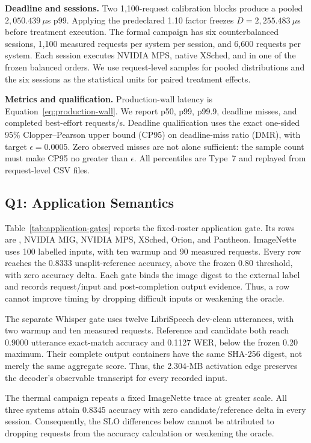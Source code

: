 \textbf{Deadline and sessions.}
Two 1,100-request calibration blocks produce a pooled
$2{,}050.439~\mu$s p99.  Applying the predeclared 1.10 factor freezes
$D=2{,}255.483~\mu$s before treatment execution.  The formal campaign has six
counterbalanced sessions, 1,100 measured requests per system per session, and
6,600 requests per system.  Each session executes NVIDIA MPS, native XSched,
and \sys in one of the frozen balanced orders.  We use request-level samples
for pooled distributions and the six sessions as the statistical units for
paired treatment effects.

\textbf{Metrics and qualification.}
Production-wall latency is Equation~\ref{eq:production-wall}.  We report p50,
p99, p99.9, deadline misses, and completed best-effort requests/s.  Deadline
qualification uses the exact one-sided 95\% Clopper--Pearson upper bound
(CP95) on deadline-miss ratio (DMR), with target $\epsilon=0.0005$.
Zero observed misses are not alone sufficient: the sample count must make
CP95 no greater than $\epsilon$.  All percentiles are Type~7 and replayed from
request-level CSV files.

\subsection{Q1: Application Semantics}

\PnineApplicationTable

Table~\ref{tab:application-gates} reports the fixed-roster application gate.
Its rows are \sys, NVIDIA MIG, NVIDIA MPS, XSched, Orion, and Pantheon.
ImageNette uses
100 labelled inputs, with ten warmup and 90 measured requests.  Every row
reaches the 0.8333 unsplit-reference accuracy, above the frozen 0.80 threshold,
with zero accuracy delta.  Each gate binds the image digest to the external
label and records request/input and post-completion output evidence.  Thus, a
row cannot improve timing by dropping difficult inputs or weakening the
oracle.

The separate \sys Whisper gate uses twelve LibriSpeech dev-clean utterances,
with two warmup and ten measured requests.  Reference and candidate both reach
0.9000 utterance exact-match accuracy and 0.1127 WER, below the frozen 0.20
maximum.  Their complete output containers have the same SHA-256 digest, not
merely the same aggregate score.  Thus, the 2.304-MB activation edge preserves
the decoder's observable transcript for every recorded input.

The thermal campaign repeats a fixed ImageNette trace at greater scale.  All
three systems attain 0.8345 accuracy with zero candidate/reference delta in
every session.  Consequently, the SLO differences below cannot be attributed
to dropping requests from the accuracy calculation or weakening the oracle.

